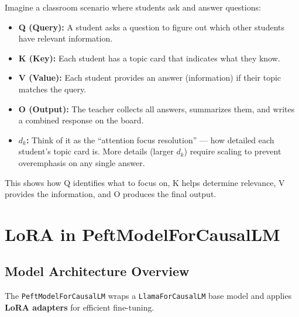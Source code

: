 \documentclass[a4paper, 12pt]{article}
\begin{document}
\begin{tcolorbox}[colback=yellow!5!white,colframe=yellow!75!black,title=Analogy]
Imagine a classroom scenario where students ask and answer questions:

\begin{itemize}
    \item \textbf{Q (Query):} A student asks a question to figure out which other students have relevant information.
    \item \textbf{K (Key):} Each student has a topic card that indicates what they know.
    \item \textbf{V (Value):} Each student provides an answer (information) if their topic matches the query.
    \item \textbf{O (Output):} The teacher collects all answers, summarizes them, and writes a combined response on the board.
    \item \textbf{$d_k$:} Think of it as the “attention focus resolution” — how detailed each student’s topic card is. More details (larger $d_k$) require scaling to prevent overemphasis on any single answer.
\end{itemize}

This shows how Q identifies what to focus on, K helps determine relevance, V provides the information, and O produces the final output.
\end{tcolorbox}


\newpage
\section*{LoRA in PeftModelForCausalLM}


\subsection*{Model Architecture Overview}

The \texttt{PeftModelForCausalLM} wraps a \texttt{LlamaForCausalLM} base model and applies \textbf{LoRA adapters} for efficient fine-tuning.
\end{document}
